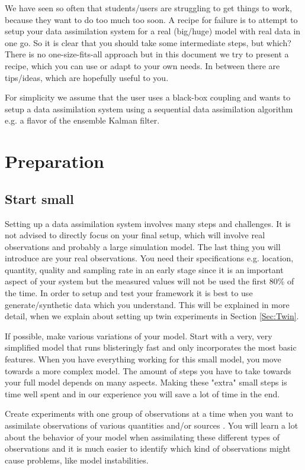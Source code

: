 \documentclass[a4paper,10pt]{article}
\begin{document}
We have seen so often that students/users are struggling to get things to work, because they want to do too much too soon. A recipe for failure is to attempt to setup your data assimilation system for a real (big/huge) model  with real data in one go. So it is clear that you should take some intermediate steps, but which? There is no one-size-fits-all approach but in this document we try to present a recipe, which you can use or adapt to your own needs. In between there are tips/ideas, which are hopefully useful to you.

For simplicity we assume that the user uses a black-box coupling and wants to setup a data assimilation system using a sequential data assimilation algorithm e.g. a flavor of the ensemble Kalman filter.

\section{Preparation}
\subsection{Start small}
Setting up a data assimilation system involves many steps and challenges. It is not advised to directly focus on your final setup, which will involve real observations and probably a large simulation model. The last thing you will introduce are your real observations. You need their specifications e.g. location, quantity, quality and sampling rate in an early stage since it is an important aspect of your system but the measured values will not be used the first 80\% of the time. In order to setup and test your framework it is best to use generate/synthetic data which you understand. This will be explained in more detail, when we explain about setting up twin experiments in Section \ref{Sec:Twin}.

If possible, make various variations of your model. Start with a very, very simplified model that runs blisteringly fast and only incorporates the most basic features. When you have everything working for this small model, you move towards a more complex model. The amount of steps you have to take towards your full model depends on many aspects. Making these "extra" small steps is time well spent and in our experience you will save a lot of time in the end. 

Create experiments with one group of observations at a time when you want to assimilate observations of various quantities and/or sources . You will learn a lot about the behavior of your model when assimilating these different types of observations and it is much easier to identify which kind of observations might cause problems, like model instabilities.
\end{document}
